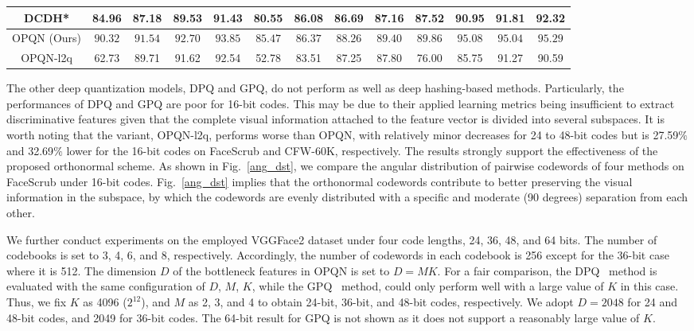 \documentclass{elsarticle}
\begin{document}
{\begin{table}[htbp]
{\begin{tabu}{ccccccccccccc}
        DCDH* &84.96 &87.18 &89.53 &91.43 &80.55 &86.08 &86.69 &87.16 &87.52 &90.95 &91.81 &92.32 \\
        \midrule
        OPQN (Ours)  &$\mathbf{90.32}$  &$\mathbf{91.54}$  &$\mathbf{92.70}$  &$\mathbf{93.85}$ &$\mathbf{85.47}$  &$\mathbf{86.37}$  &$\mathbf{88.26}$  &$\mathbf{89.40}$ &$\mathbf{89.86}$  &$\mathbf{95.08}$  &$\mathbf{95.04}$  &$\mathbf{95.29}$ \\
        OPQN-l2q &62.73  &89.71  &91.62  &92.54  &52.78 &83.51  &87.25  &87.80 &76.00 &85.75  &91.27  &90.59 \\
        \bottomrule
    \end{tabu}}
    \label{table:map_single}
\end{table}
}

The other deep quantization models, DPQ and GPQ, do not perform as well as deep hashing-based methods. Particularly, the performances of DPQ and GPQ are poor for 16-bit codes. This may be due to their applied learning metrics being insufficient to extract discriminative features given that the complete visual information attached to the feature vector is divided into several subspaces. 
It is worth noting that the variant, OPQN-l2q, performs worse than OPQN, with relatively minor decreases for 24 to 48-bit codes but is 27.59$\%$ and 32.69$\%$ lower for the 16-bit codes on FaceScrub and CFW-60K, respectively. The results strongly support the effectiveness of the proposed orthonormal scheme. As shown in Fig.~\ref{ang_dst}, we compare the angular distribution of pairwise codewords of four methods on FaceScrub under 16-bit codes. Fig.~\ref{ang_dst} implies that the orthonormal codewords contribute to better preserving the visual information in the subspace, by which the codewords are evenly distributed with a specific and moderate (90 degrees) separation from each other. 

We further conduct experiments on the employed VGGFace2 dataset under four code lengths, 24, 36, 48, and 64 bits. The number of codebooks is set to 3, 4, 6, and 8, respectively. Accordingly, the number of codewords in each codebook is 256 except for the 36-bit case where it is 512. The dimension $D$ of the bottleneck features in OPQN is set to $D=MK$. For a fair comparison, the DPQ~\cite{klein2019end} method is evaluated with the same configuration of $D$, $M$, $K$, while the GPQ~\cite{jang2020generalized} method, could only perform well with a large value of $K$ in this case. Thus, we fix $K$ as 4096 ($2^{12}$), and $M$ as 2, 3, and 4 to obtain 24-bit, 36-bit, and 48-bit codes, respectively. We adopt $D=2048$ for 24 and 48-bit codes, and 2049 for 36-bit codes. The 64-bit result for GPQ is not shown as it does not support a reasonably large value of $K$.
\end{document}
